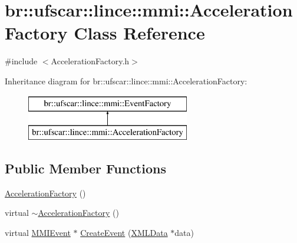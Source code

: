\hypertarget{classbr_1_1ufscar_1_1lince_1_1mmi_1_1AccelerationFactory}{
\section{br::ufscar::lince::mmi::AccelerationFactory Class Reference}
\label{classbr_1_1ufscar_1_1lince_1_1mmi_1_1AccelerationFactory}
}


{\ttfamily \#include $<$AccelerationFactory.h$>$}

Inheritance diagram for br::ufscar::lince::mmi::AccelerationFactory:\begin{figure}[H]
\begin{center}
\leavevmode
\includegraphics[height=2cm]{classbr_1_1ufscar_1_1lince_1_1mmi_1_1AccelerationFactory}
\end{center}
\end{figure}
\subsection*{Public Member Functions}
\begin{DoxyCompactItemize}
\item 
\hyperlink{classbr_1_1ufscar_1_1lince_1_1mmi_1_1AccelerationFactory_aeba6ded86331f14a169b9e507a0e6531}{AccelerationFactory} ()
\item 
virtual \hyperlink{classbr_1_1ufscar_1_1lince_1_1mmi_1_1AccelerationFactory_a5df5c784ea0f38f5adbd54a213bb0852}{$\sim$AccelerationFactory} ()
\item 
virtual \hyperlink{classbr_1_1ufscar_1_1lince_1_1mmi_1_1MMIEvent}{MMIEvent} $\ast$ \hyperlink{classbr_1_1ufscar_1_1lince_1_1mmi_1_1AccelerationFactory_a5b8858d27f1b956b6c1f27648c010d74}{CreateEvent} (\hyperlink{structbr_1_1ufscar_1_1lince_1_1mmi_1_1XMLData}{XMLData} $\ast$data)
\end{DoxyCompactItemize}


